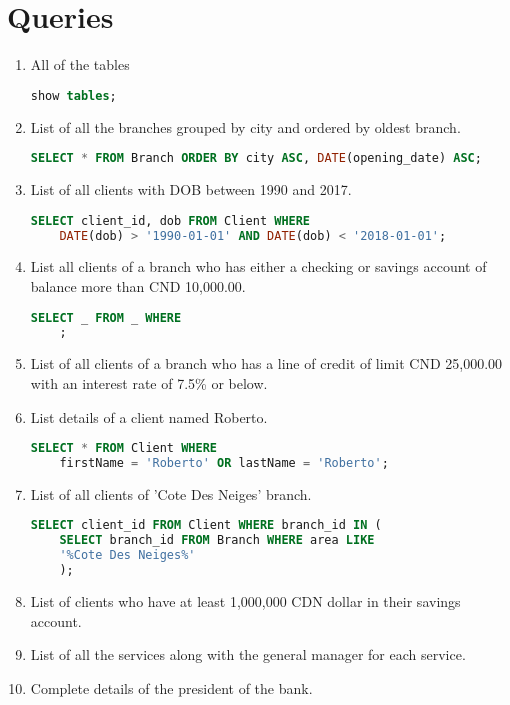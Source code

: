 \documentclass[letterpaper, 12pt]{article}
\begin{document}
\section{Queries}

\begin{enumerate}[label=(\alph*)]
  \item All of the tables
    \begin{lstlisting}[language=sql]
show tables;
  \end{lstlisting}
  \item List of all the branches grouped by city and ordered by oldest branch.
    \begin{lstlisting}[language=sql]
SELECT * FROM Branch ORDER BY city ASC, DATE(opening_date) ASC;
  \end{lstlisting}
  \item List of all clients with DOB between 1990 and 2017.
    \begin{lstlisting}[language=sql]
SELECT client_id, dob FROM Client WHERE 
	DATE(dob) > '1990-01-01' AND DATE(dob) < '2018-01-01';
  \end{lstlisting}
  \item List all clients of a branch who has either a checking or savings account of balance more than CND 10,000.00.
    \begin{lstlisting}[language=sql]
SELECT _ FROM _ WHERE 
	;
  \end{lstlisting}
  \item List of all clients of a branch who has a line of credit of limit CND 25,000.00 with an interest rate of 7.5\% or below.
  \item List details of a client named Roberto.
    \begin{lstlisting}[language=sql]
SELECT * FROM Client WHERE 
	firstName = 'Roberto' OR lastName = 'Roberto';
  \end{lstlisting}
  \item List of all clients of 'Cote Des Neiges' branch.
    \begin{lstlisting}[language=sql]
SELECT client_id FROM Client WHERE branch_id IN (
	SELECT branch_id FROM Branch WHERE area LIKE
	'%Cote Des Neiges%'
    );
  \end{lstlisting}
  \item List of clients who have at least 1,000,000 CDN dollar in their savings account.
  \item List of all the services along with the general manager for each service.
  \item Complete details of the president of the bank.
\end{enumerate}
\end{document}

